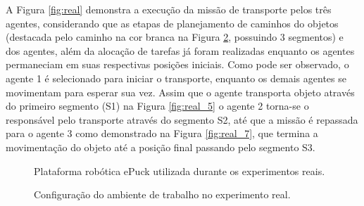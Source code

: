 A Figura \ref{fig:real} demonstra a execução da missão de transporte pelos três agentes, considerando que as etapas de planejamento de caminhos do objetos (destacada pelo caminho na cor branca na Figura \ref{fig:real_workspace}, possuindo 3 segmentos) e dos agentes, além da alocação de tarefas já foram realizadas enquanto os agentes permaneciam em suas respectivas posições iniciais.
Como pode ser observado, o agente 1 é selecionado para iniciar o transporte, enquanto os demais agentes se movimentam para esperar sua vez.
Assim que o agente transporta objeto através do primeiro segmento (S1) na Figura \ref{fig:real_5} o agente 2 torna-se o responsável pelo transporte através do segmento S2, até que a missão é repassada para o agente 3 como demonstrado na Figura \ref{fig:real_7}, que termina a movimentação do objeto até a posição final passando pelo segmento S3.

\begin{figure}[h]
  \centering
  \setlength{\fboxsep}{0pt}
  \caption{Plataforma robótica ePuck utilizada durante os experimentos reais.}
  \label{fig:epucks}
\end{figure}

\begin{figure}[h]
  \centering
  \setlength{\fboxsep}{0pt}
  \caption{Configuração do ambiente de trabalho no experimento real.}
  \label{fig:real_workspace}
\end{figure}

